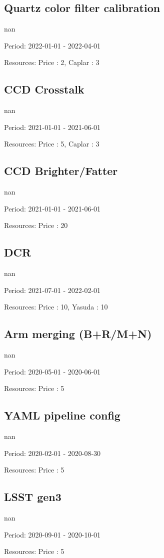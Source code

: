 \subsection{Quartz color filter calibration}

nan

Period: 2022-01-01 - 2022-04-01

Resources: Price : 2, Caplar : 3

\subsection{CCD Crosstalk}

nan

Period: 2021-01-01 - 2021-06-01

Resources: Price : 5, Caplar : 3

\subsection{CCD Brighter/Fatter}

nan

Period: 2021-01-01 - 2021-06-01

Resources: Price : 20

\subsection{DCR}

nan

Period: 2021-07-01 - 2022-02-01

Resources: Price : 10, Yasuda : 10

\subsection{Arm merging (B+R/M+N)}

nan

Period: 2020-05-01 - 2020-06-01

Resources: Price : 5

\subsection{YAML pipeline config}

nan

Period: 2020-02-01 - 2020-08-30

Resources: Price : 5

\subsection{LSST gen3}

nan

Period: 2020-09-01 - 2020-10-01

Resources: Price : 5

